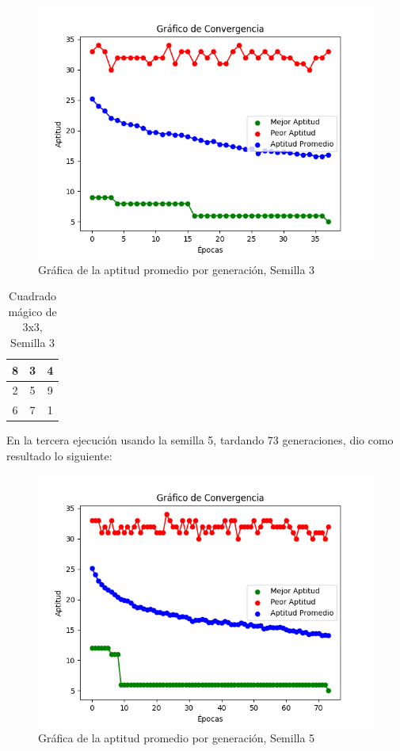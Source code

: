 \documentclass{report}
\begin{document}
    \begin{figure}[H]
        \centering
        \includegraphics[scale=0.5]{Grafica2.png}
        \caption{Gráfica de la aptitud promedio por generación, Semilla 3}
    \end{figure}
    \begin{table}[H]
        \centering
        \begin{tabular}{|c|c|c|}
            \hline
            8 & 3 & 4\\
            \hline
            2 & 5 & 9\\
            \hline
            6 & 7 & 1\\
            \hline
        \end{tabular}
        \caption{Cuadrado mágico de 3x3, Semilla 3}
    \end{table}
    En la tercera ejecución usando la semilla 5, tardando 73 generaciones, dio como resultado lo siguiente:
    \begin{figure}[H]
        \centering
        \includegraphics[scale=0.5]{Grafica3.png}
        \caption{Gráfica de la aptitud promedio por generación, Semilla 5}
    \end{figure}
\end{document}

